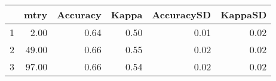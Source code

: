 \begin{table}[ht]
\begin{center}
{\tiny
\begin{tabular}{rrrrrr}
  \hline
 & mtry & Accuracy & Kappa & AccuracySD & KappaSD \\ 
  \hline
1 & 2.00 & 0.64 & 0.50 & 0.01 & 0.02 \\ 
  2 & 49.00 & 0.66 & 0.55 & 0.02 & 0.02 \\ 
  3 & 97.00 & 0.66 & 0.54 & 0.02 & 0.02 \\ 
   \hline
\end{tabular}
}
\end{center}
\end{table}

